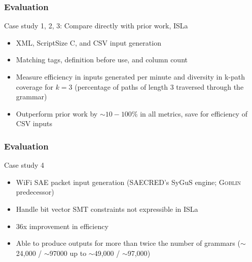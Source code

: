 \documentclass[11pt,xcolor={dvipsnames},hyperref={pdftex,pdfpagemode=UseNone,hidelinks,pdfdisplaydoctitle=true},usepdftitle=false]{beamer}
\newcommand{\system}{\textsc{Goblin}}
\newcommand{\green}[1]{\textcolor{green!60!black}{#1}}
\newcommand{\blue}[1]{\textcolor{blue!70!black}{#1}}
\begin{document}
\begin{frame}
    \frametitle{Evaluation}
    Case study 1, 2, 3: Compare directly with prior work, ISLa\pause
    \begin{itemize}
        \item XML, ScriptSize C, and CSV input generation \pause
        \item Matching tags, definition before use, and column count\pause
        \item Measure \green{efficiency} in inputs generated per minute and \green{diversity}
        in \green{k-path coverage} for \blue{$k=3$} (percentage of paths of length $3$ traversed through the grammar)\pause
        \item Outperform prior work by \blue{$\sim$$10-100\%$} in all metrics, save for efficiency of CSV inputs
    \end{itemize}
\end{frame}

\begin{frame}
    \frametitle{Evaluation}
    Case study 4\pause
    \begin{itemize}
        \item WiFi SAE packet input generation (SAECRED's SyGuS engine; \system{} predecessor) \pause
        \item Handle \green{bit vector SMT constraints} not expressible in ISLa \pause
        \item 36x improvement in efficiency \pause
        \item Able to produce outputs for more than twice the number of grammars 
        (\blue{$\sim$24,000 / $\sim$97000} up to \blue{$\sim$49,000 / $\sim$97,000})
    \end{itemize}
\end{frame}
\end{document}
